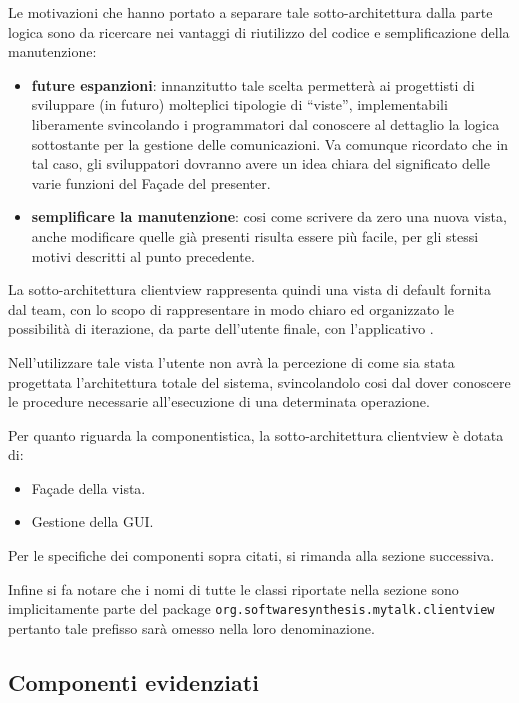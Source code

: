Le motivazioni che hanno portato a separare tale sotto-architettura dalla parte logica sono da ricercare nei vantaggi di riutilizzo del codice e semplificazione della manutenzione:
\begin{itemize}
 	\item \textbf{future espanzioni}: innanzitutto tale scelta permetterà ai progettisti di sviluppare (in futuro) molteplici tipologie di ``viste'', implementabili liberamente svincolando i programmatori dal conoscere al dettaglio la logica sottostante per la gestione delle comunicazioni. Va comunque ricordato che in tal caso, gli sviluppatori dovranno avere un idea chiara del significato delle varie funzioni del Façade del presenter.
 	\item \textbf{semplificare la manutenzione}: cosi come scrivere da zero una nuova vista, anche modificare quelle già presenti risulta essere più facile, per gli stessi motivi descritti al punto precedente.
\end{itemize}

La sotto-architettura clientview rappresenta quindi una vista di default fornita dal team, con lo scopo di rappresentare in modo chiaro ed organizzato le possibilità di iterazione, da parte dell'utente finale, con l'applicativo \caName{}.

Nell'utilizzare tale vista l'utente non avrà la percezione di come sia stata progettata l'architettura totale del sistema, svincolandolo cosi dal dover conoscere le procedure necessarie all'esecuzione di una determinata operazione.

Per quanto riguarda la componentistica, la sotto-architettura clientview è dotata di:
\begin{itemize}
	\item Façade della vista.
	\item Gestione della GUI.
\end{itemize}

Per le specifiche dei componenti sopra citati, si rimanda alla sezione successiva.

Infine si fa notare che i nomi di tutte le classi riportate nella sezione sono implicitamente parte del package \texttt{org.softwaresynthesis.mytalk.clientview} pertanto tale prefisso sarà omesso nella loro denominazione.

\subsection{Componenti evidenziati}

